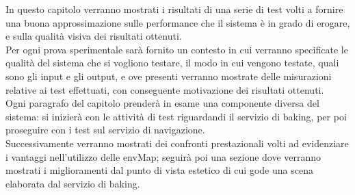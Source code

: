 In questo capitolo verranno mostrati i risultati di una serie di test volti a fornire una buona approssimazione sulle performance che il sistema è in grado di erogare, e sulla qualità visiva dei risultati ottenuti. 
\\
Per ogni prova sperimentale sarà fornito un contesto in cui verranno specificate le qualità del sistema che si vogliono testare, il modo in cui vengono testate, quali sono gli input e gli output, e ove presenti verranno mostrate delle misurazioni relative ai test effettuati, con conseguente motivazione dei risultati ottenuti. 
\\
Ogni paragrafo del capitolo prenderà in esame una componente diversa del sistema: si inizierà con le attività di test riguardandi il servizio di baking, per poi proseguire con i test sul servizio di navigazione. 
\\
Successivamente verranno mostrati dei confronti prestazionali volti ad evidenziare i vantaggi nell’utilizzo delle envMap; seguirà poi una sezione dove verranno mostrati i miglioramenti dal punto di vista estetico di cui gode una scena elaborata dal servizio di baking.
